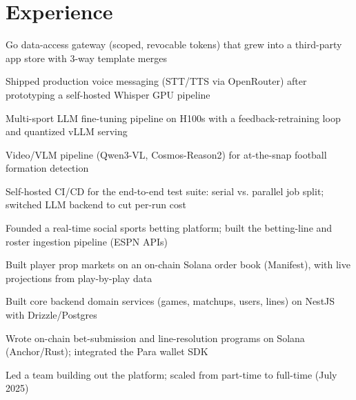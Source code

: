 \documentclass[print]{jack-resume}
\begin{document}
\section{Experience}

\begin{tightemize}
    \item Go data-access gateway (scoped, revocable tokens) that grew into a third-party app store with 3-way template merges
    \item Shipped production voice messaging (STT/TTS via OpenRouter) after prototyping a self-hosted Whisper GPU pipeline
    \item Multi-sport LLM fine-tuning pipeline on H100s with a feedback-retraining loop and quantized vLLM serving
    \item Video/VLM pipeline (Qwen3-VL, Cosmos-Reason2) for at-the-snap football formation detection
    \item Self-hosted CI/CD for the end-to-end test suite: serial vs. parallel job split; switched LLM backend to cut per-run cost
\end{tightemize}
\sectionsep

\begin{tightemize}
    \item Founded a real-time social sports betting platform; built the betting-line and roster ingestion pipeline (ESPN APIs)
    \item Built player prop markets on an on-chain Solana order book (Manifest), with live projections from play-by-play data
    \item Built core backend domain services (games, matchups, users, lines) on NestJS with Drizzle/Postgres
    \item Wrote on-chain bet-submission and line-resolution programs on Solana (Anchor/Rust); integrated the Para wallet SDK
    \item Led a team building out the platform; scaled from part-time to full-time (July 2025)
\end{tightemize}
\sectionsep
\end{document}
